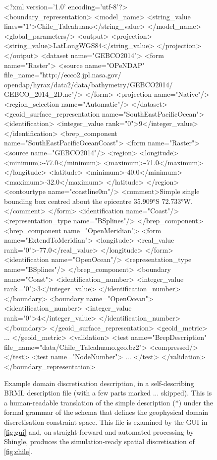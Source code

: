 \documentclass[a4paper, 10pt]{book}
\providecommand{\shingle}{Shingle\xspace}
\providecommand{\brml}{BRML\xspace}
\providecommand{\refdescriptionquotelink}{(\protect\hyperlink{description}{$\ast$})\xspace}
\begin{document}
\begin{figure}[]
\centering
\begin{xmlcode}
<?xml version='1.0' encoding='utf-8'?>
<boundary_representation>
  <model_name>
    <string_value lines="1">Chile_Talcahuano</string_value>
  </model_name>
  <global_parameters/>
  <output>
    <projection>
      <string_value>LatLongWGS84</string_value>
    </projection>
  </output>
  <dataset name="GEBCO2014">
    <form name="Raster">
      <source name="OPeNDAP" file_name="http://ecco2.jpl.nasa.gov/ opendap/hyrax/data2/data/bathymetry/GEBCO2014/ GEBCO_2014_2D.nc"/>
    </form>
    <projection name="Native"/>
    <region_selection name="Automatic"/>
  </dataset>
  <geoid_surface_representation name="SouthEastPacificOcean">
    <identification>
      <integer_value rank="0">9</integer_value>
    </identification>
    <brep_component name="SouthEastPacificOceanCoast">
      <form name="Raster">
        <source name="GEBCO2014"/>
        <region>
          <longitude>
            <minimum>-77.0</minimum>
            <maximum>-71.0</maximum>
          </longitude>
          <latitude>
            <minimum>-40.0</minimum>
            <maximum>-32.0</maximum>
          </latitude>
        </region>
        <contourtype name="coastline0m"/>
        <comment>Simple single bounding box centred about the epicentre 35.909°S 72.733°W.</comment>
      </form>
      <identification name="Coast"/>
      <representation_type name="BSplines"/>
    </brep_component>
    <brep_component name="OpenMeridian">
      <form name="ExtendToMeridian">
        <longitude>
          <real_value rank="0">-77.0</real_value>
        </longitude>
      </form>
      <identification name="OpenOcean"/>
      <representation_type name="BSplines"/>
    </brep_component>
    <boundary name="Coast">
      <identification_number>
        <integer_value rank="0">3</integer_value>
      </identification_number>
    </boundary>
    <boundary name="OpenOcean">
      <identification_number>
        <integer_value rank="0">4</integer_value>
      </identification_number>
    </boundary>
  </geoid_surface_representation>
  <geoid_metric>
    ...
  </geoid_metric>
  <validation>
    <test name="BrepDescription" file_name="data/Chile_Talcahuano.geo.bz2">
      <compressed/></test>
    <test name="NodeNumber"> ... </test>
  </validation>
</boundary_representation>
\end{xmlcode}
\caption{
Example domain discretisation description, in a self-describing
%
\brml
description file
(with a few parts marked ... skipped).
%
%
This is a human-readable translation of the simple description
\refdescriptionquotelink
%
under the formal grammar of the schema that defines the geophysical domain discretisation constraint space.
%
This file is examined by the GUI in \cref{fig:gui} and,
on straight-forward and automated processing by \shingle, produces the
simulation-ready spatial discretisation of \cref{fig:chile}.
}
\label{fig:brml}
\end{figure}
%
\end{document}
